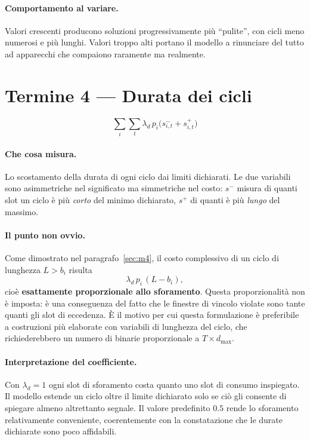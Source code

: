 \paragraph{Comportamento al variare.} Valori crescenti producono soluzioni progressivamente più
``pulite'', con cicli meno numerosi e più lunghi. Valori troppo alti portano il modello a
rinunciare del tutto ad apparecchi che compaiono raramente ma realmente.

\section{Termine 4 --- Durata dei cicli}

\begin{equation}
  \sum_{i} \sum_{t} \lambda_d \, p_i \bigl( s^{-}_{i,t} + s^{+}_{i,t} \bigr)
\end{equation}

\paragraph{Che cosa misura.} Lo scostamento della durata di ogni ciclo dai limiti dichiarati. Le
due variabili sono asimmetriche nel significato ma simmetriche nel costo: $s^{-}$ misura di quanti
slot un ciclo è più \emph{corto} del minimo dichiarato, $s^{+}$ di quanti è più \emph{lungo} del
massimo.

\paragraph{Il punto non ovvio.} Come dimostrato nel paragrafo~\ref{sec:m4}, il costo complessivo di
un ciclo di lunghezza $L > b_i$ risulta
\begin{equation}
  \lambda_d \, p_i \, (L - b_i),
\end{equation}
cioè \textbf{esattamente proporzionale allo sforamento}. Questa proporzionalità non è imposta: è
una conseguenza del fatto che le finestre di vincolo violate sono tante quanti gli slot di
eccedenza. È il motivo per cui questa formulazione è preferibile a costruzioni più elaborate con
variabili di lunghezza del ciclo, che richiederebbero un numero di binarie proporzionale a
$T \times d_{\max}$.

\paragraph{Interpretazione del coefficiente.} Con $\lambda_d = 1$ ogni slot di sforamento costa
quanto uno slot di consumo inspiegato. Il modello estende un ciclo oltre il limite dichiarato solo
se ciò gli consente di spiegare almeno altrettanto segnale. Il valore predefinito $0.5$ rende lo
sforamento relativamente conveniente, coerentemente con la constatazione che le durate dichiarate
sono poco affidabili.

